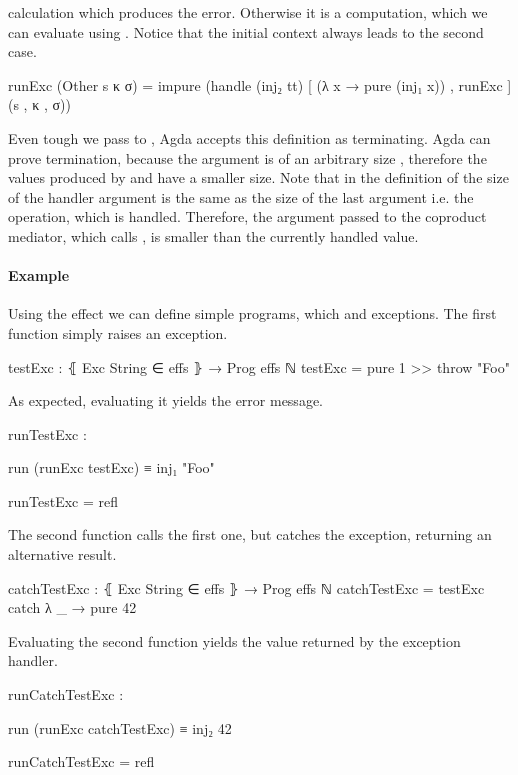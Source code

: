  calculation which produces the error.
Otherwise it is a computation, which we can evaluate using .
Notice that the initial context always leads to the second case.
\begin{code}
runExc (Other s κ σ) = impure (handle (inj₂ tt) [ (λ x → pure (inj₁ x)) , runExc ] (s , κ , σ))
\end{code}
Even tough we pass  to , Agda accepts this
definition as terminating.
Agda can prove termination, because the argument is of an arbitrary size
, therefore the values produced by  and
 have a smaller size.
Note that in the definition of  the size of the handler
argument is the same as the size of the last argument i.e. the operation, which
is handled.
Therefore, the argument passed to the coproduct mediator, which calls
, is smaller than the currently handled value.

\paragraph{Example}
Using the  effect we can define simple programs, which
 and  exceptions.
The first function simply raises an exception.
\begin{code}
testExc : ⦃ Exc String ∈ effs ⦄ → Prog effs ℕ
testExc = pure 1 >> throw "Foo"
\end{code}
As expected, evaluating it yields the error message.
\begin{center}
\begin{code}
runTestExc :
\end{code}
\begin{code}[inline]
 run (runExc testExc) ≡ inj₁ "Foo"
\end{code}
\begin{code}
runTestExc = refl
\end{code}
\end{center}
The second function calls the first one, but catches the exception, returning an
alternative result.
\begin{code}
catchTestExc : ⦃ Exc String ∈ effs ⦄ → Prog effs ℕ
catchTestExc = testExc catch λ _ → pure 42
\end{code}
Evaluating the second function yields the value returned by the exception
handler.
\begin{center}
\begin{code}
runCatchTestExc :
\end{code}
\begin{code}[inline]
 run (runExc catchTestExc) ≡ inj₂ 42
\end{code}
\begin{code}
runCatchTestExc = refl
\end{code}
\end{center}

